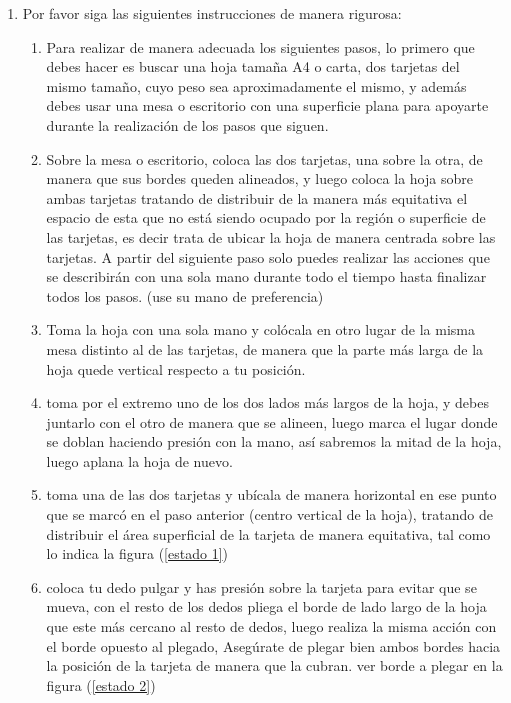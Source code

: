 \documentclass{article}
\begin{document}
\begin{enumerate}
  \item Por favor siga las siguientes instrucciones de manera rigurosa:
  \begin{enumerate}
  
  \item Para realizar de manera adecuada los siguientes pasos, lo primero que debes hacer es buscar una hoja tamaña A4 o carta, dos tarjetas del mismo tamaño, cuyo peso sea aproximadamente el mismo, y además debes usar una mesa o escritorio con una superficie plana para apoyarte durante la realización de los pasos que siguen.
  
  \item Sobre la mesa o escritorio, coloca las dos tarjetas, una sobre la otra, de manera que sus bordes queden alineados, y luego coloca la hoja sobre ambas tarjetas tratando de distribuir de la manera más equitativa el espacio de esta que no está siendo ocupado por la región o superficie de las tarjetas, es decir trata de ubicar la hoja de manera centrada sobre las tarjetas. A partir del siguiente paso solo puedes realizar las acciones que se describirán con una sola mano durante todo el tiempo hasta finalizar todos los pasos. (use su mano de preferencia)
  
  \item Toma la hoja con una sola mano y colócala en otro lugar de la misma mesa distinto al de las tarjetas, de manera que la parte más larga de la hoja quede vertical respecto a tu posición.
  
  \item toma por el extremo uno de los dos lados más largos de la hoja, y debes juntarlo con el otro de manera que se alineen, luego marca el lugar donde se doblan haciendo presión con la mano, así sabremos la mitad de la hoja, luego aplana la hoja de nuevo.
  
  \item toma una de las dos tarjetas y ubícala de manera horizontal en ese punto que se marcó en el paso anterior (centro vertical de la hoja), tratando de distribuir el área superficial de la tarjeta de manera equitativa, tal como lo indica la figura (\ref{estado 1})
  
  \item coloca tu dedo pulgar y has presión sobre la tarjeta para evitar que se mueva, con el resto de los dedos pliega el borde de lado largo de la hoja que este más cercano al resto de dedos, luego realiza la misma acción con el borde opuesto al plegado, Asegúrate de plegar bien ambos bordes hacia la posición de la tarjeta de manera que la cubran. ver borde a plegar en la figura (\ref{estado 2})
  

\end{enumerate}
\end{enumerate}
\end{document}
